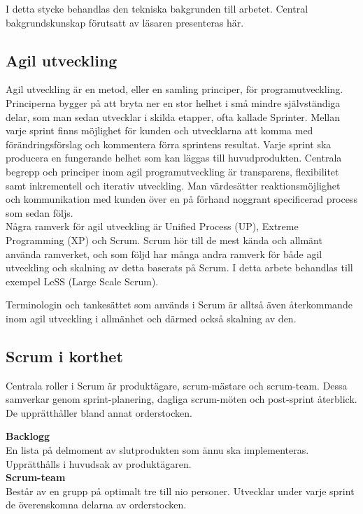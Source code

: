 	I detta stycke behandlas den tekniska bakgrunden till arbetet. Central bakgrundskunskap förutsatt av läsaren presenteras här.
	
	\subsection{Agil utveckling}
	
		Agil utveckling är en metod, eller en samling principer, för programutveckling. Principerna bygger på att bryta ner en stor helhet i små mindre självständiga delar, som man sedan utvecklar i skilda etapper, ofta kallade Sprinter.
		Mellan varje sprint finns möjlighet för kunden och utvecklarna att komma med förändringsförslag och kommentera förra sprintens resultat. Varje sprint ska producera en fungerande helhet som kan läggas till huvudprodukten. Centrala begrepp och principer inom agil programutveckling är transparens, flexibilitet samt inkrementell och iterativ utveckling. Man värdesätter reaktionsmöjlighet och kommunikation med kunden över en på förhand noggrant specificerad process som sedan följs. \cite{agile_manifesto}
		\\
		Några ramverk för agil utveckling är Unified Process (UP), Extreme Programming (XP) och Scrum.
		Scrum hör till de mest kända och allmänt använda ramverket, och som följd har många andra ramverk för både agil utveckling och skalning av detta baserats på Scrum. I detta arbete behandlas till exempel LeSS (Large Scale Scrum).
		
		Terminologin och tankesättet som används i Scrum är alltså även återkommande inom agil utveckling i allmänhet och därmed också skalning av den.
		
	\subsection{Scrum i korthet}	
		
		Centrala roller i Scrum är produktägare, scrum-mästare och scrum-team. Dessa samverkar genom sprint-planering, dagliga scrum-möten och post-sprint återblick. De upprätthåller bland annat orderstocken.
		
		\textbf{Backlogg} \\
		En lista på delmoment av slutprodukten som ännu ska implementeras. Upprätthålls i huvudsak av produktägaren. \\	
		
		\textbf{Scrum-team} \\
		Består av en grupp på optimalt tre till nio personer. Utvecklar under varje sprint de överenskomna delarna av orderstocken. \\
		
